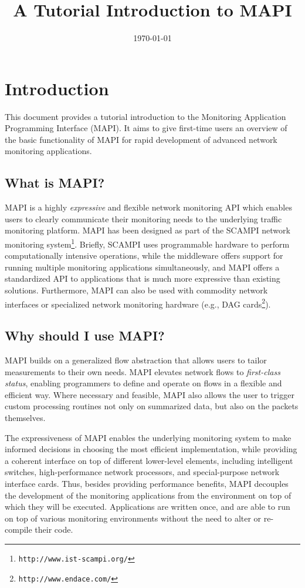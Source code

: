 \documentclass[a4paper, 11pt]{article}
\begin{document}
\title{\bf A Tutorial Introduction to MAPI}
\date{\small \today}
\maketitle
\thispagestyle{empty}



\section{Introduction}

This document provides a tutorial introduction to the Monitoring Application
Programming Interface (MAPI). It aims to give first-time users an overview
of the basic functionality of MAPI for rapid development of advanced
network monitoring applications.

\subsection{What is MAPI?}

MAPI is a highly {\em expressive} and flexible network monitoring API which
enables users to clearly communicate their monitoring needs to the
underlying traffic monitoring platform.
MAPI has been designed as part of the SCAMPI network monitoring
system\footnote{\tt http://www.ist-scampi.org/}.
Briefly, SCAMPI uses programmable hardware to perform computationally
intensive operations, while the middleware offers support for running
multiple monitoring applications simultaneously, and MAPI offers a
standardized API to applications that is much more expressive than existing
solutions. Furthermore, MAPI can also be used with commodity network
interfaces or specialized network monitoring hardware (e.g., DAG
cards\footnote{\tt http://www.endace.com/}).

\subsection{Why should I use MAPI?}

MAPI builds on a generalized flow abstraction that allows users to tailor
measurements to their own needs.
MAPI elevates network flows to {\em first-class status}, 
enabling programmers to define and operate on flows in a flexible and 
efficient way.
Where necessary and feasible, MAPI also allows the user to trigger
custom processing routines not only on summarized data, but also on 
the packets themselves.

The expressiveness of MAPI enables the underlying monitoring
system to make informed decisions in choosing the most efficient
implementation, while providing a coherent interface on top of different
lower-level elements, including intelligent switches,
high-performance network processors, and special-purpose network
interface cards. Thus, besides providing performance benefits,
MAPI decouples the development of the monitoring applications from the
environment on top of which they will be executed. Applications are written
once, and are able to run on top of various monitoring environments without
the need to alter or re-compile their code.
\end{document}
